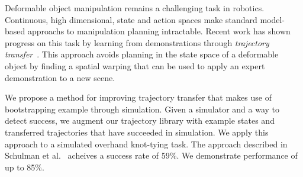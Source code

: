 Deformable object manipulation remains a challenging task in robotics.
Continuous, high dimensional, state and action spaces make standard
model-based approachs to manipulation planning intractable. Recent work
has shown progress on this task by learning from
demonstrations through 
\emph{trajectory transfer}~\cite{Schulmanetal_ISRR2013, Schulmanetal_IROS2013}. This 
approach avoids planning in the state space of a deformable object
by finding a spatial warping that can be used to apply an expert demonstration
to a new scene.

We propose a method for improving trajectory transfer that makes use of bootstrapping
example through simulation. Given a simulator and a way to detect success, we augment
our trajectory library with example states and transferred trajectories that have succeeded
in simulation. We apply this approach to a simulated overhand knot-tying task. The
approach described in Schulman et al.~\cite{Schulmanetal_ISRR2013} acheives a success rate
of 59\%. We demonstrate performance of up to 85\%. 
